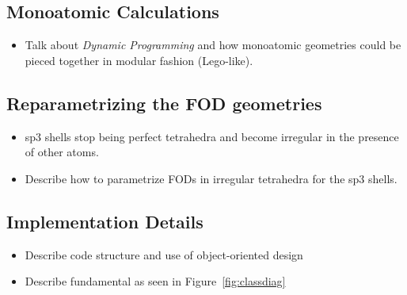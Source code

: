 \documentclass[12pt,a4paper,]{report}
\providecommand{\tightlist}{%
  \setlength{\itemsep}{0pt}\setlength{\parskip}{0pt}}
\begin{document}
\subsection{Monoatomic Calculations}\label{monoatomic-calculations}

\begin{itemize}
\tightlist
\item
  Talk about \emph{Dynamic Programming} and how monoatomic geometries
  could be pieced together in modular fashion (Lego-like).
\end{itemize}

\subsection{Reparametrizing the FOD
geometries}\label{reparametrizing-the-fod-geometries}

\begin{itemize}
\tightlist
\item
  sp3 shells stop being perfect tetrahedra and become irregular in the
  presence of other atoms.
\item
  Describe how to parametrize FODs in irregular tetrahedra for the sp3
  shells.
\end{itemize}

\subsection{Implementation Details}\label{implementation-details}

\begin{itemize}
\tightlist
\item
  Describe code structure and use of object-oriented design
\item
  Describe fundamental as seen in Figure~\ref{fig:classdiag}
\end{itemize}
\end{document}
